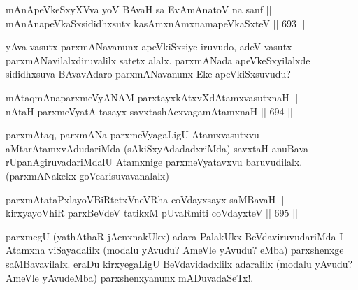 
\begin{shl}
mAnApeVkeSxyXVva yoV BAvaH sa EvAmAnatoV na sanf || \\
mAnAnapeVkaSxsididhxsutx kasAmxnAmxnamapeVkaSxteV \hfill || 693 ||  
\end{shl}

\begin{artha} 
yAva vasutx parxmANavanunx apeVkiSxsiye iruvudo, adeV vasutx parxmANavilalxdiruvalilx satetx alalx. parxmANada apeVkeSxyilalxde sididhxsuva BAvavAdaro parxmANavanunx Eke apeVkiSxsuvudu?
\end{artha}


\begin{shl}
mAtaqmAnaparxmeVyANAM parxtayxkAtxvXdAtamxvasutxnaH || \\
nAtaH parxmeVyatA tasayx savxtashAcxvagamAtamxnaH \hfill || 694 ||  
\end{shl}

\begin{artha} 
parxmAtaq, parxmANa-parxmeVyagaLigU Atamxvasutxvu\break 
aMtarAtamxvAdudariMda (sAkiSxyAdadadxriMda) savxtaH anuBava 
rUpanAgiruvadariMdalU Atamxnige parxmeVyatavxvu baruvudilalx. 
(parxmANakekx goVcarisuvavanalalx)
\end{artha}


\begin{shl}
parxmAtataPxlayoVBiRtetxVneVRha coVdayxsayx saMBavaH || \\
kirxyayoVhiR parxBeVdeV tatikxM pUvaRmiti coVdayxteV \hfill || 695 ||  
\end{shl}

\begin{artha} 
parxmegU (yathAthaR jAcnxnakUkx) adara PalakUkx 
BeVdaviruvudariMda I Atamxna viSayadalilx (modalu yAvudu? AmeVle 
yAvudu? eMba) parxshenxge saMBavavilalx. eraDu kirxyegaLigU 
BeVdavidadxlilx adaralilx (modalu yAvudu? AmeVle yAvudeMba) 
parxshenxyanunx mADuvadaSeTx!.
\end{artha}

